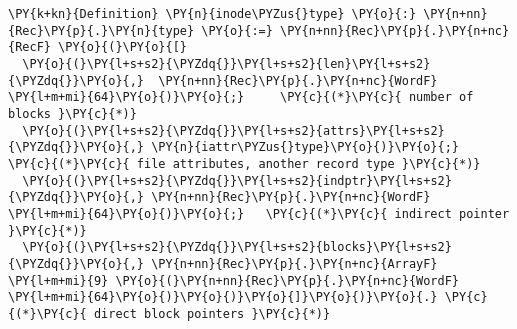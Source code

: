 \begin{BVerbatim}[commandchars=\\\{\}]
\PY{k+kn}{Definition} \PY{n}{inode\PYZus{}type} \PY{o}{:} \PY{n+nn}{Rec}\PY{p}{.}\PY{n}{type} \PY{o}{:=} \PY{n+nn}{Rec}\PY{p}{.}\PY{n+nc}{RecF} \PY{o}{(}\PY{o}{[}
  \PY{o}{(}\PY{l+s+s2}{\PYZdq{}}\PY{l+s+s2}{len}\PY{l+s+s2}{\PYZdq{}}\PY{o}{,}  \PY{n+nn}{Rec}\PY{p}{.}\PY{n+nc}{WordF} \PY{l+m+mi}{64}\PY{o}{)}\PY{o}{;}     \PY{c}{(*}\PY{c}{ number of blocks }\PY{c}{*)}
  \PY{o}{(}\PY{l+s+s2}{\PYZdq{}}\PY{l+s+s2}{attrs}\PY{l+s+s2}{\PYZdq{}}\PY{o}{,} \PY{n}{iattr\PYZus{}type}\PY{o}{)}\PY{o}{;}      \PY{c}{(*}\PY{c}{ file attributes, another record type }\PY{c}{*)}
  \PY{o}{(}\PY{l+s+s2}{\PYZdq{}}\PY{l+s+s2}{indptr}\PY{l+s+s2}{\PYZdq{}}\PY{o}{,} \PY{n+nn}{Rec}\PY{p}{.}\PY{n+nc}{WordF} \PY{l+m+mi}{64}\PY{o}{)}\PY{o}{;}   \PY{c}{(*}\PY{c}{ indirect pointer }\PY{c}{*)}
  \PY{o}{(}\PY{l+s+s2}{\PYZdq{}}\PY{l+s+s2}{blocks}\PY{l+s+s2}{\PYZdq{}}\PY{o}{,} \PY{n+nn}{Rec}\PY{p}{.}\PY{n+nc}{ArrayF} \PY{l+m+mi}{9} \PY{o}{(}\PY{n+nn}{Rec}\PY{p}{.}\PY{n+nc}{WordF} \PY{l+m+mi}{64}\PY{o}{)}\PY{o}{)}\PY{o}{]}\PY{o}{)}\PY{o}{.} \PY{c}{(*}\PY{c}{ direct block pointers }\PY{c}{*)}
\end{BVerbatim}
